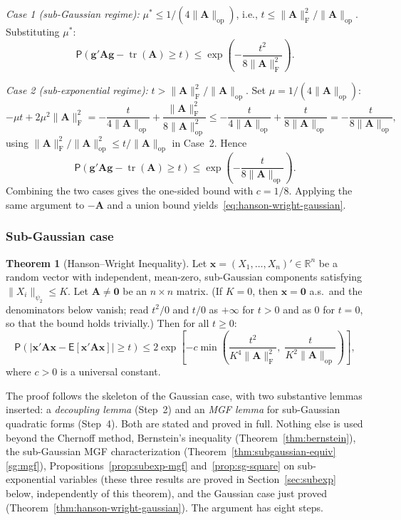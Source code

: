 \documentclass[12pt,a4paper]{article}
\makeatletter
\theoremstyle{definition}
\newtheorem{theorem}{Theorem}[section]
\renewenvironment{proof}[1][\proofname]{\par
  \pushQED{\qed}%
  \normalfont \topsep6\p@\@plus6\p@\relax
  \trivlist
  \item[\hskip\labelsep\bfseries #1\@addpunct{.}]\ignorespaces
}{%
  \popQED\endtrivlist\@endpefalse
}
\newcommand\expc{\mathsf{E}}
\newcommand\prb{\mathsf{P}}
\DeclareMathOperator\tr{tr}
\newcommand{\bx}{\mathbf{x}}
\newcommand{\bzero}{\mathbf{0}}
\newcommand{\bA}{\mathbf{A}}
\newcommand{\bg}{\mathbf{g}}
\newcommand{\Real}{\mathbb{R}}
\newcommand{\opnorm}[1]{\|#1\|_{\mathrm{op}}}
\newcommand{\fnorm}[1]{\|#1\|_{\mathrm{F}}}
\makeatother
\begin{document}
\begin{proof}
\emph{Case 1 (sub-Gaussian regime):} $\mu^* \leqslant 1/(4\opnorm{\bA})$, i.e., $t \leqslant \fnorm{\bA}^2/\opnorm{\bA}$. Substituting $\mu^*$:
\[
\prb(\bg'\bA\bg - \tr(\bA) \geqslant t) \leqslant \exp\!\left(-\frac{t^2}{8\fnorm{\bA}^2}\right).
\]

\emph{Case 2 (sub-exponential regime):} $t > \fnorm{\bA}^2/\opnorm{\bA}$. Set $\mu = 1/(4\opnorm{\bA})$:
\[
-\mu t + 2\mu^2 \fnorm{\bA}^2 = -\frac{t}{4\opnorm{\bA}} + \frac{\fnorm{\bA}^2}{8\opnorm{\bA}^2} \leqslant -\frac{t}{4\opnorm{\bA}} + \frac{t}{8\opnorm{\bA}} = -\frac{t}{8\opnorm{\bA}},
\]
using $\fnorm{\bA}^2/\opnorm{\bA}^2 \leqslant t/\opnorm{\bA}$ in Case~2. Hence
\[
\prb(\bg'\bA\bg - \tr(\bA) \geqslant t) \leqslant \exp\!\left(-\frac{t}{8\opnorm{\bA}}\right).
\]
Combining the two cases gives the one-sided bound with $c = 1/8$. Applying the same argument to $-\bA$ and a union bound yields~\eqref{eq:hanson-wright-gaussian}.
\end{proof}

\subsubsection*{Sub-Gaussian case}

\begin{theorem}[Hanson--Wright Inequality]\label{thm:hanson-wright}
Let $\bx = (X_1, \ldots, X_n)' \in \Real^n$ be a random vector with independent, mean-zero, sub-Gaussian components satisfying $\|X_i\|_{\psi_2} \leqslant K$. Let $\bA \neq \bzero$ be an $n \times n$ matrix. (If $K = 0$, then $\bx = \bzero$ a.s.\ and the denominators below vanish; read $t^2/0$ and $t/0$ as $+\infty$ for $t > 0$ and as $0$ for $t = 0$, so that the bound holds trivially.) Then for all $t \geqslant 0$:
\begin{equation}\label{eq:hanson-wright}
\boxed{\prb\!\left(\left|\bx'\bA\bx - \expc[\bx'\bA\bx]\right| \geqslant t\right) \leqslant 2\exp\!\left[-c\min\!\left(\frac{t^2}{K^4\fnorm{\bA}^2},\; \frac{t}{K^2\opnorm{\bA}}\right)\right],}
\end{equation}
where $c > 0$ is a universal constant.
\end{theorem}

The proof follows the skeleton of the Gaussian case, with two substantive lemmas inserted: a \emph{decoupling lemma} (Step~2) and an \emph{MGF lemma} for sub-Gaussian quadratic forms (Step~4). Both are stated and proved in full. Nothing else is used beyond the Chernoff method, Bernstein's inequality (Theorem~\ref{thm:bernstein}), the sub-Gaussian MGF characterization (Theorem~\ref{thm:subgaussian-equiv}\ref{sg:mgf}), Propositions~\ref{prop:subexp-mgf} and~\ref{prop:sg-square} on sub-exponential variables (these three results are proved in Section~\ref{sec:subexp} below, independently of this theorem), and the Gaussian case just proved (Theorem~\ref{thm:hanson-wright-gaussian}). The argument has eight steps.
\end{document}
